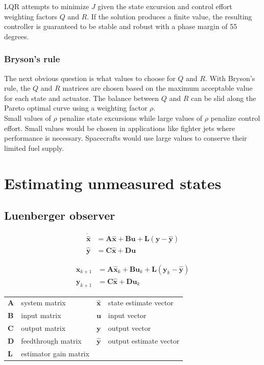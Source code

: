 \documentclass[10pt,conference,compsoc]{IEEEtran}
\newcommand{\mtx}[1] {\bm #1}
\begin{document}
\noindent LQR attempts to minimize $J$ given the state excursion and control
effort weighting factors $Q$ and $R$. If the solution produces a finite value,
the resulting controller is guaranteed to be stable and robust with a phase
margin of 55 degrees.

\subsubsection{Bryson's rule}

\noindent The next obvious question is what values to choose for $Q$ and $R$.
With Bryson's rule, the $Q$ and $R$ matrices are chosen based on the maximum
acceptable value for each state and actuator. The balance between $Q$ and $R$
can be slid along the Pareto optimal curve using a weighting factor $\rho$. \\

\noindent Small values of $\rho$ penalize state excursions while large values of
$\rho$ penalize control effort. Small values would be chosen in applications
like fighter jets where performance is necessary. Spacecrafts would use large
values to conserve their limited fuel supply.

\section{Estimating unmeasured states}

\subsection{Luenberger observer}

\begin{align}
  \dot{\hat{\mtx{x}}} &= \mtx{A}\hat{\mtx{x}} + \mtx{B}\mtx{u} +
    \mtx{L} (\mtx{y} - \hat{\mtx{y}}) \label{eq:s_obsv_x} \\
  \hat{\mtx{y}} &= \mtx{C}\hat{\mtx{x}} + \mtx{D}\mtx{u} \label{eq:s_obsv_y}
\end{align}

\begin{align}
  \hat{\mtx{x}}_{k+1} &= \mtx{A}\hat{\mtx{x}}_k + \mtx{B}\mtx{u}_k +
    \mtx{L} (\mtx{y}_k - \hat{\mtx{y}}) \label{eq:z_obsv_x} \\
  \hat{\mtx{y}}_{k+1} &= \mtx{C}\hat{\mtx{x}} +
    \mtx{D}\mtx{u}_k \label{eq:z_obsv_y}
\end{align}

\begin{table}[ht]
  \renewcommand{\arraystretch}{1.3}
  \centering
  \begin{tabular}{llll}
    $\mtx{A}$ & system matrix      & $\hat{\mtx{x}}$ & state estimate vector \\
    $\mtx{B}$ & input matrix       & $\mtx{u}$ & input vector \\
    $\mtx{C}$ & output matrix      & $\mtx{y}$ & output vector \\
    $\mtx{D}$ & feedthrough matrix & $\hat{\mtx{y}}$ & output estimate vector \\
    $\mtx{L}$ & estimator gain matrix & & \\
  \end{tabular}
  \label{tab:obsv_def}
\end{table}
\end{document}
